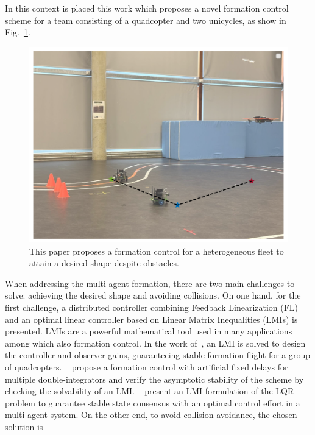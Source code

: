 \documentclass{ifacconf}
\begin{document}
In this context is placed this work which proposes a novel formation control scheme
for a team consisting of a quadcopter and two unicycles, as show in Fig.~\ref{fig:summary_image}.
\begin{figure}
    \centering
    \includegraphics[width=0.9\columnwidth, trim=10 50 15 110, clip]{images/output.pdf}
    \caption{This paper proposes a formation control for a heterogeneous fleet to attain a desired shape despite obstacles.}
    \label{fig:summary_image}
    \vspace{-0.1cm}
\end{figure}
When addressing the multi-agent formation, there are two main challenges to solve: 
achieving the desired shape and avoiding collisions.
On one hand, for the first challenge, a distributed controller combining Feedback 
Linearization (FL) and an optimal linear controller based on Linear Matrix 
Inequalities (LMIs) is presented.
LMIs are a powerful mathematical tool used in many applications among which also 
formation control.
In the work of~\cite{Trejo2023}, an LMI is solved to design the controller 
and observer gains, guaranteeing stable formation flight for a group of quadcopters.
~\cite{Deshpande2011} propose a formation control with artificial 
fixed delays for multiple double-integrators and 
verify the asymptotic stability of the scheme by checking 
the solvability of an LMI.
~\cite{Semsar2009} present an LMI formulation of the LQR problem 
to guarantee stable state consensus with an optimal control effort 
in a multi-agent system.
On the other end, to avoid collision avoidance, the chosen solution is 
\end{document}
